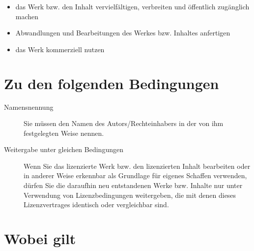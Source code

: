 \documentclass[a4paper,12pt,twoside]{book} %
\begin{document}
\begin{itemize}
 \item das Werk bzw. den Inhalt vervielfältigen, verbreiten und öffentlich zugänglich machen
 \item Abwandlungen und Bearbeitungen des Werkes bzw. Inhaltes anfertigen
 \item das Werk kommerziell nutzen
\end{itemize}

\section{Zu den folgenden Bedingungen}

\begin{description}
 \item[Namensnennung] Sie müssen den Namen des Autors/Rechteinhabers in der von ihm 
festgelegten Weise nennen.

 \item[Weitergabe unter gleichen Bedingungen] Wenn Sie das lizenzierte Werk bzw. den 
lizenzierten Inhalt bearbeiten oder in anderer Weise erkennbar als Grundlage für 
eigenes Schaffen verwenden, dürfen Sie die daraufhin neu entstandenen Werke bzw. 
Inhalte nur unter Verwendung von Lizenzbedingungen weitergeben, die mit denen dieses 
Lizenzvertrages identisch oder vergleichbar sind.
 \end{description}

\section{Wobei gilt}
\end{document}
